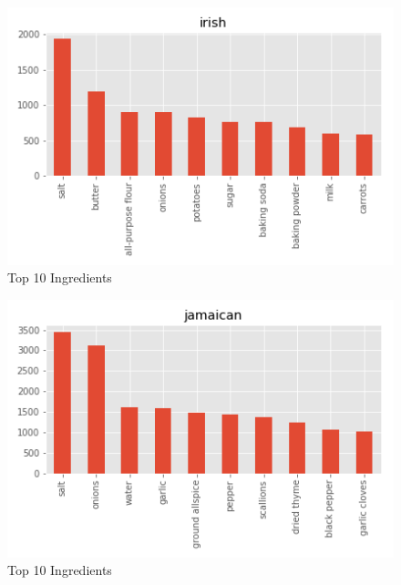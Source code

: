 \documentclass[sigconf]{acmart}
\begin{document}
\begin{figure}[!ht]
  \centering\includegraphics[width=\columnwidth]{images/irish_10_most_used_ingredients.png}
  \caption{Top 10 Ingredients }\label{f:irish_10_most_used_ingredients}
\end{figure}

\begin{figure}[!ht]
  \centering\includegraphics[width=\columnwidth]{images/jamaican_10_most_used_ingredients.png}
  \caption{Top 10 Ingredients }\label{f:jamaican_10_most_used_ingredients}
\end{figure}
\end{document}
